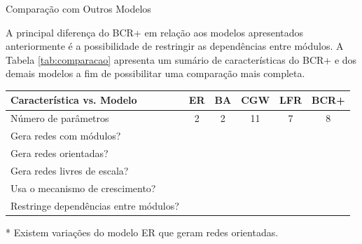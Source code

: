 \begin{section}{Comparação com Outros Modelos}
	
	A principal diferença do BCR+ em relação aos modelos apresentados anteriormente é a possibilidade de restringir as dependências entre módulos. A Tabela \ref{tab:comparacao} apresenta um sumário de características do BCR+ e dos demais modelos a fim de possibilitar uma comparação mais completa.

\renewcommand{\S}{\CheckmarkBold}
\newcommand{\N}{\XSolidBrush}
	
\begin{threeparttable}[hb]
	\begin{center}
	\caption{Características do modelo BCR+ comparadas a características de outros modelos.}
	\label{tab:comparacao}
	\centering
	\begin{tabular}{|l|c|c|c|c|c|}
		\hline
		\textbf{Característica vs. Modelo} & \textbf{ER} & \textbf{BA} & \textbf{CGW} & \textbf{LFR} & \textbf{BCR+} \\
		\hline
		\hline
		Número de parâmetros                      & 2  &  2 & 11  & 7   &  8 \\
		\hline
		Gera redes com módulos?                   & \N & \N & \S & \S & \S \\
		\hline
		Gera redes orientadas?                    & \N\tnote{*} & \N & \S & \S & \S \\ \hline
		Gera redes livres de escala?              & \N & \S & \S & \S & \S \\
		\hline
		Usa o mecanismo de crescimento?           & \N & \S & \S & \N & \S \\
		\hline
		Restringe dependências entre módulos?    & \N & \N & \N & \N & \S \\
		\hline
	\end{tabular}
	\begin{tablenotes}
	\item[*] Existem variações do modelo ER que geram redes orientadas.
	\end{tablenotes}	
	\end{center}
\end{threeparttable}


\end{section}
